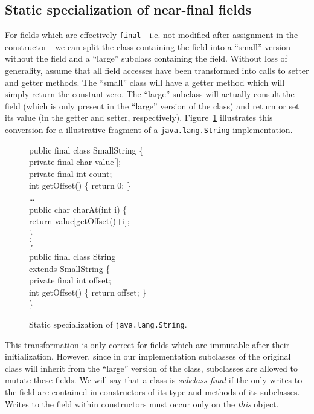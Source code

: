 \documentclass[preprint]{acmconf}
\begin{document}
\subsection{Static specialization of near-final fields}
For fields which are effectively {\tt final}---i.e. not modified after
assignment in the constructor---we can split the class containing the
field into a ``small'' version without the field and a ``large''
subclass containing the field.  Without loss of generality, assume
that all field accesses have been transformed into calls to setter and
getter methods.  The ``small'' class will have a getter method
which will simply return the constant zero.  The ``large''
subclass will actually consult the field (which is only present in the
``large'' version of the class) and return or set its value (in the
getter and setter, respectively).  Figure~\ref{fig:big-small} illustrates this
conversion for a illustrative fragment of a {\tt java.lang.String}
implementation.
\begin{figure}
\begin{samplecode}
public final class SmallString \{\\
\>private final char value[];\\
\>private final int count;\\
\>int getOffset() \{ return 0; \}\\
\>\ldots\\
\>public char charAt(int i) \{\\
\>\>return value[getOffset()+i];\\
\>\}\\
\}\\
public final class String\\
\>\>extends SmallString \{\\
\>private final int offset;\\
\>int getOffset() \{ return offset; \}\\
\}\\
\end{samplecode}
\caption{Static specialization of {\tt java.lang.String}.}
\label{fig:big-small}
\end{figure}

This transformation is only correct for fields which are immutable
after their initialization.  However, since in our implementation
subclasses of the
original class will inherit from the ``large'' version of the class,
subclasses are allowed to mutate these fields.  We will say that
a class is {\it subclass-final} if the only writes to the field
are contained in constructors of its type and methods of its
subclasses.  Writes to the field within constructors must occur only on
the {\it this} object.
\end{document}
